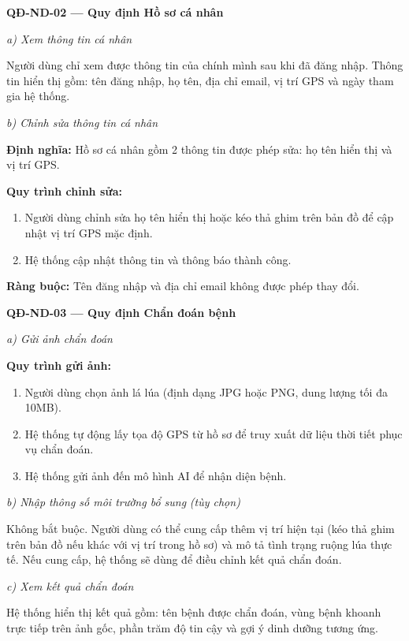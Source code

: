 \documentclass[12pt,a4paper]{article}
\begin{document}
\vspace{0.3cm}
\noindent\textbf{QĐ-ND-02 --- Quy định Hồ sơ cá nhân}

\noindent\textit{a) Xem thông tin cá nhân}

Người dùng chỉ xem được thông tin của chính mình sau khi đã đăng nhập. Thông tin hiển thị gồm: tên đăng nhập, họ tên, địa chỉ email, vị trí GPS và ngày tham gia hệ thống.

\noindent\textit{b) Chỉnh sửa thông tin cá nhân}

\noindent\textbf{Định nghĩa:} Hồ sơ cá nhân gồm 2 thông tin được phép sửa: họ tên hiển thị và vị trí GPS.

\noindent\textbf{Quy trình chỉnh sửa:}
\begin{enumerate}
    \item Người dùng chỉnh sửa họ tên hiển thị hoặc kéo thả ghim trên bản đồ để cập nhật vị trí GPS mặc định.
    \item Hệ thống cập nhật thông tin và thông báo thành công.
\end{enumerate}
\noindent\textbf{Ràng buộc:} Tên đăng nhập và địa chỉ email không được phép thay đổi.


\vspace{0.3cm}
\noindent\textbf{QĐ-ND-03 --- Quy định Chẩn đoán bệnh}

\noindent\textit{a) Gửi ảnh chẩn đoán}

\noindent\textbf{Quy trình gửi ảnh:}
\begin{enumerate}
    \item Người dùng chọn ảnh lá lúa (định dạng JPG hoặc PNG, dung lượng tối đa 10MB).
    \item Hệ thống tự động lấy tọa độ GPS từ hồ sơ để truy xuất dữ liệu thời tiết phục vụ chẩn đoán.
    \item Hệ thống gửi ảnh đến mô hình AI để nhận diện bệnh.
\end{enumerate}

\noindent\textit{b) Nhập thông số môi trường bổ sung} \textit{(tùy chọn)}

Không bắt buộc. Người dùng có thể cung cấp thêm vị trí hiện tại (kéo thả ghim trên bản đồ nếu khác với vị trí trong hồ sơ) và mô tả tình trạng ruộng lúa thực tế. Nếu cung cấp, hệ thống sẽ dùng để điều chỉnh kết quả chẩn đoán.

\noindent\textit{c) Xem kết quả chẩn đoán}

Hệ thống hiển thị kết quả gồm: tên bệnh được chẩn đoán, vùng bệnh khoanh trực tiếp trên ảnh gốc, phần trăm độ tin cậy và gợi ý dinh dưỡng tương ứng.
\end{document}
